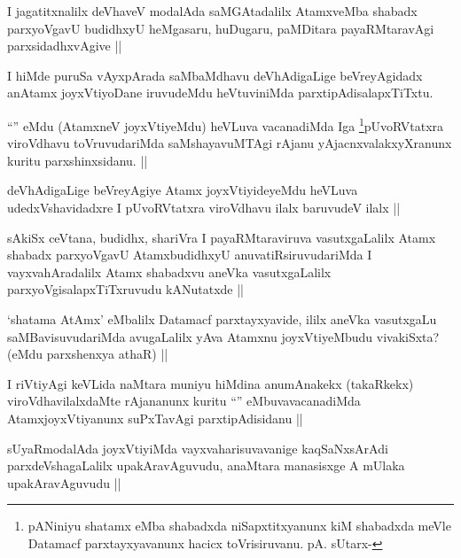 \begin{artha}
I jagatitxnalilx deVhaveV modalAda saMGAtadalilx AtamxveMba shabadx parxyoVgavU budidhxyU heMgasaru, huDugaru, paMDitara payaRMtaravAgi parxsidadhxvAgive ||
\end{artha}

\begin{artha}
I hiMde puruSa vAyxpArada saMbaMdhavu deVhAdigaLige beVreyAgidadx anAtamx joyxVtiyoDane iruvudeMdu  heVtuviniMda parxtipAdisalapxTiTxtu.
\end{artha}

\begin{artha}
``\stext'' eMdu (AtamxneV joyxVtiyeMdu) heVLuva vacanadiMda Iga \footnote{pANiniyu shatamx eMba shabadxda niSapxtitxyanunx kiM shabadxda meVle Datamacf parxtayxyavanunx hacicx toVrisiruvanu. pA. sUtarx-}pUvoRVtatxra viroVdhavu toVruvudariMda saMshayavuMTAgi rAjanu yAjacnxvalakxyXranunx kuritu parxshinxsidanu. || 
\end{artha}

\begin{artha}
deVhAdigaLige beVreyAgiye Atamx joyxVtiyideyeMdu heVLuva udedxVshavidadxre I pUvoRVtatxra viroVdhavu ilalx baruvudeV ilalx ||
\end{artha}

\begin{artha}
sAkiSx ceVtana, budidhx, shariVra I payaRMtaraviruva vasutxgaLalilx Atamx shabadx parxyoVgavU AtamxbudidhxyU anuvatiRsiruvudariMda I vayxvahAradalilx Atamx shabadxvu aneVka vasutxgaLalilx parxyoVgisalapxTiTxruvudu kANutatxde ||
\end{artha}

\begin{artha}
`shatama AtAmx' eMbalilx Datamacf parxtayxyavide, ililx aneVka vasutxgaLu saMBavisuvudariMda avugaLalilx yAva Atamxnu joyxVtiyeMbudu vivakiSxta? (eMdu parxshenxya athaR) ||
\end{artha}

\begin{artha}
I riVtiyAgi keVLida naMtara muniyu hiMdina anumAnakekx (takaRkekx) viroVdhavilalxdaMte rAjananunx kuritu ``\stext'' eMbuvavacanadiMda AtamxjoyxVtiyanunx suPxTavAgi parxtipAdisidanu ||
\end{artha}

\begin{artha}
sUyaRmodalAda joyxVtiyiMda vayxvaharisuvavanige kaqSaNxsArAdi parxdeVshagaLalilx upakAravAguvudu, anaMtara manasisxge A mUlaka upakAravAguvudu ||
\end{artha}

